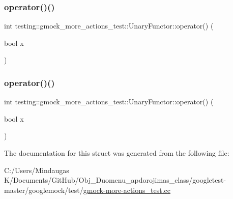 \mbox{\label{structtesting_1_1gmock__more__actions__test_1_1_unary_functor_a3c33592b266e8ed2c7980df9868db53a}} 
\subsubsection{\texorpdfstring{operator()()}{operator()()}\hspace{0.1cm}{\footnotesize\ttfamily [2/3]}}
{\footnotesize\ttfamily int testing\+::gmock\+\_\+more\+\_\+actions\+\_\+test\+::\+Unary\+Functor\+::operator() (\begin{DoxyParamCaption}\item[{bool}]{x }\end{DoxyParamCaption})\hspace{0.3cm}{\ttfamily [inline]}}

\mbox{\label{structtesting_1_1gmock__more__actions__test_1_1_unary_functor_a3c33592b266e8ed2c7980df9868db53a}} 
\subsubsection{\texorpdfstring{operator()()}{operator()()}\hspace{0.1cm}{\footnotesize\ttfamily [3/3]}}
{\footnotesize\ttfamily int testing\+::gmock\+\_\+more\+\_\+actions\+\_\+test\+::\+Unary\+Functor\+::operator() (\begin{DoxyParamCaption}\item[{bool}]{x }\end{DoxyParamCaption})\hspace{0.3cm}{\ttfamily [inline]}}



The documentation for this struct was generated from the following file\+:\begin{DoxyCompactItemize}
\item 
C\+:/\+Users/\+Mindaugas K/\+Documents/\+Git\+Hub/\+Obj\+\_\+\+Duomenu\+\_\+apdorojimas\+\_\+class/googletest-\/master/googlemock/test/\mbox{\hyperlink{googletest-master_2googlemock_2test_2gmock-more-actions__test_8cc}{gmock-\/more-\/actions\+\_\+test.\+cc}}\end{DoxyCompactItemize}
